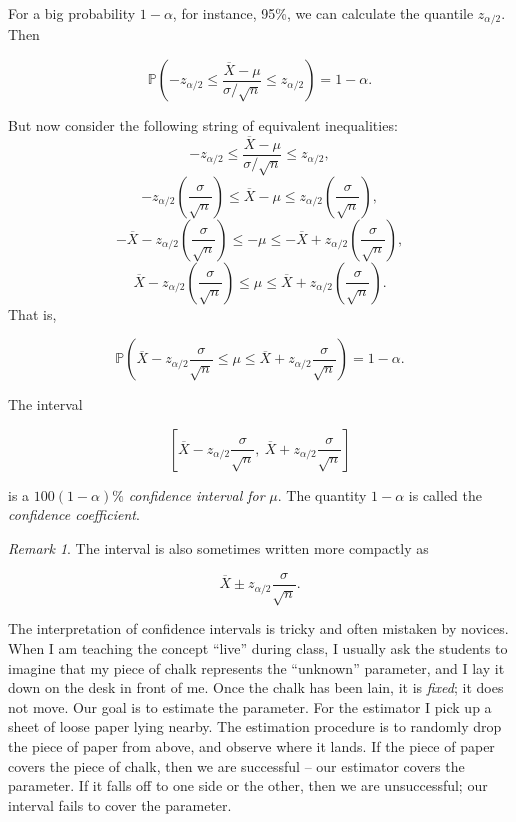 \documentclass[]{book}
\numberwithin{equation}{chapter}
\numberwithin{figure}{chapter}
\theoremstyle{plain}
\theoremstyle{definition}
\theoremstyle{remark}
\theoremstyle{definition}
\theoremstyle{definition}
\theoremstyle{remark}
\newtheorem*{remark}{Remark}
\let\BeginKnitrBlock\begin \let\EndKnitrBlock\end
\begin{document}
For a big probability \(1-\alpha\), for instance, 95\%, we can calculate
the quantile \(z_{\alpha/2}\). Then

\begin{equation}
\mathbb{P}\left(-z_{\alpha/2}\leq\frac{\overline{X}-\mu}{\sigma/\sqrt{n}}\leq z_{\alpha/2}\right)=1-\alpha.
\end{equation}

But now consider the following string of equivalent inequalities: \[
-z_{\alpha/2}\leq\frac{\overline{X}-\mu}{\sigma/\sqrt{n}}\leq z_{\alpha/2},
\] \[
-z_{\alpha/2}\left(\frac{\sigma}{\sqrt{n}}\right)\leq\overline{X}-\mu\leq z_{\alpha/2}\left(\frac{\sigma}{\sqrt{n}}\right),
\] \[
-\overline{X} - z_{\alpha/2}\left(\frac{\sigma}{\sqrt{n}}\right)\leq - \mu \leq - \overline{X} + z_{\alpha/2} \left( \frac{\sigma}{\sqrt{n}} \right),
\] \[
\overline{X} - z_{\alpha/2} \left( \frac{\sigma}{\sqrt{n}} \right) \leq \mu \leq \overline{X} + z_{\alpha/2} \left( \frac{\sigma}{\sqrt{n}} \right).
\] That is,

\begin{equation}
\mathbb{P}\left(\overline{X}-z_{\alpha/2}\frac{\sigma}{\sqrt{n}}\leq\mu\leq\overline{X}+z_{\alpha/2}\frac{\sigma}{\sqrt{n}}\right)=1-\alpha.
\end{equation}

\bigskip

\BeginKnitrBlock{definition}
\protect\hypertarget{def:unnamed-chunk-351}{}{\label{def:unnamed-chunk-351}}The
interval

\begin{equation}
\left[\overline{X}-z_{\alpha/2}\frac{\sigma}{\sqrt{n}},\ \overline{X}+z_{\alpha/2}\frac{\sigma}{\sqrt{n}}\right]
\end{equation}

is a \(100(1-\alpha)\%\) \emph{confidence interval for} \(\mu\). The
quantity \(1-\alpha\) is called the \emph{confidence coefficient}.
\EndKnitrBlock{definition}

\bigskip

\begin{remark}
The interval is also sometimes written more compactly as

\begin{equation}
\label{eq-z-interval}
\overline{X}\pm z_{\alpha/2}\frac{\sigma}{\sqrt{n}}.
\end{equation}
\end{remark}

The interpretation of confidence intervals is tricky and often mistaken
by novices. When I am teaching the concept ``live'' during class, I
usually ask the students to imagine that my piece of chalk represents
the ``unknown'' parameter, and I lay it down on the desk in front of me.
Once the chalk has been lain, it is \emph{fixed}; it does not move. Our
goal is to estimate the parameter. For the estimator I pick up a sheet
of loose paper lying nearby. The estimation procedure is to randomly
drop the piece of paper from above, and observe where it lands. If the
piece of paper covers the piece of chalk, then we are successful -- our
estimator covers the parameter. If it falls off to one side or the
other, then we are unsuccessful; our interval fails to cover the
parameter.
\end{document}

